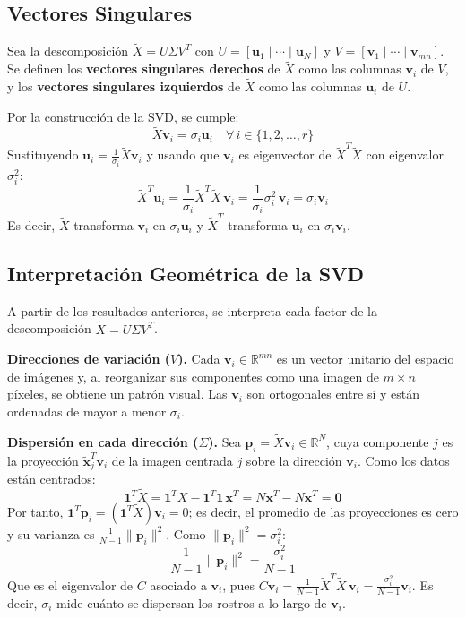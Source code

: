 \subsection{Vectores Singulares}

Sea la descomposición $\tilde{X} = U\Sigma V^T$ con
$U = [\mathbf{u}_1 \mid \cdots \mid \mathbf{u}_N]$ y
$V = [\mathbf{v}_1 \mid \cdots \mid \mathbf{v}_{mn}]$. Se definen los
\textbf{vectores singulares derechos} de $\tilde{X}$ como las columnas
$\mathbf{v}_i$ de $V$, y los \textbf{vectores singulares izquierdos} de
$\tilde{X}$ como las columnas $\mathbf{u}_i$ de $U$.

Por la construcción de la SVD, se cumple:
\[
\tilde{X}\mathbf{v}_i = \sigma_i\mathbf{u}_i \quad \forall \, i \in \{1, 2, \dots, r\}
\]
Sustituyendo $\mathbf{u}_i = \frac{1}{\sigma_i}\tilde{X}\mathbf{v}_i$ y
usando que $\mathbf{v}_i$ es eigenvector de $\tilde{X}^T\tilde{X}$ con
eigenvalor $\sigma_i^2$:
\[
\tilde{X}^T\mathbf{u}_i
= \frac{1}{\sigma_i}\tilde{X}^T\tilde{X}\,\mathbf{v}_i
= \frac{1}{\sigma_i}\sigma_i^2\,\mathbf{v}_i
= \sigma_i\mathbf{v}_i
\]
Es decir, $\tilde{X}$ transforma $\mathbf{v}_i$ en $\sigma_i\mathbf{u}_i$ y
$\tilde{X}^T$ transforma $\mathbf{u}_i$ en $\sigma_i\mathbf{v}_i$.


\subsection{Interpretación Geométrica de la SVD}

A partir de los resultados anteriores, se interpreta cada factor de la
descomposición $\tilde{X} = U\Sigma V^T$.

\textbf{Direcciones de variación ($V$).} Cada $\mathbf{v}_i \in \mathbb{R}^{mn}$
es un vector unitario del espacio de imágenes y, al reorganizar sus componentes
como una imagen de $m \times n$ píxeles, se obtiene un patrón visual. Las
$\mathbf{v}_i$ son ortogonales entre sí y están ordenadas de mayor a menor
$\sigma_i$.

\textbf{Dispersión en cada dirección ($\Sigma$).} Sea $\mathbf{p}_i = \tilde{X}\mathbf{v}_i
\in \mathbb{R}^N$, cuya componente $j$ es la proyección $\tilde{\mathbf{x}}_j^T\mathbf{v}_i$
de la imagen centrada $j$ sobre la dirección $\mathbf{v}_i$. Como los datos están centrados:
\[
\mathbf{1}^T\tilde{X} = \mathbf{1}^TX - \mathbf{1}^T\mathbf{1}\,\bar{\mathbf{x}}^T
= N\bar{\mathbf{x}}^T - N\bar{\mathbf{x}}^T = \mathbf{0}
\]
Por tanto, $\mathbf{1}^T\mathbf{p}_i = (\mathbf{1}^T\tilde{X})\mathbf{v}_i = 0$;
es decir, el promedio de las proyecciones es cero y su varianza es
$\frac{1}{N-1}\|\mathbf{p}_i\|^2$. Como $\|\mathbf{p}_i\|^2 = \sigma_i^2$:
\[
\frac{1}{N-1}\|\mathbf{p}_i\|^2 = \frac{\sigma_i^2}{N-1}
\]
Que es el eigenvalor de $C$ asociado a $\mathbf{v}_i$, pues
$C\mathbf{v}_i = \frac{1}{N-1}\tilde{X}^T\tilde{X}\,\mathbf{v}_i
= \frac{\sigma_i^2}{N-1}\mathbf{v}_i$. Es decir, $\sigma_i$ mide cuánto se
dispersan los rostros a lo largo de $\mathbf{v}_i$.

